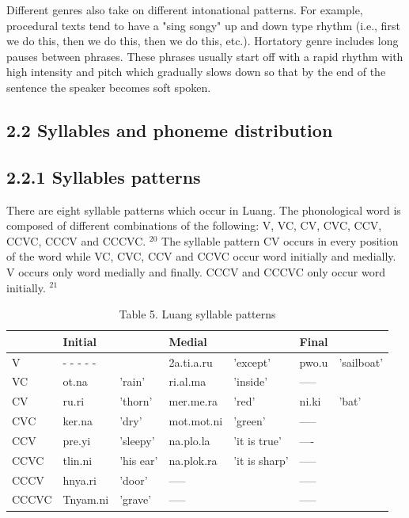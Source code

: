 \documentclass[10pt]{article}
\begin{document}
Different genres also take on different intonational patterns. For example, procedural texts tend to have a "sing songy" up and down type rhythm (i.e., first we do this, then we do this, then we do this, etc.). Hortatory genre includes long pauses between phrases. These phrases usually start off with a rapid rhythm with high intensity and pitch which gradually slows down so that by the end of the sentence the speaker becomes soft spoken.

\subsection*{2.2 Syllables and phoneme distribution}
\subsection*{2.2.1 Syllables patterns}
There are eight syllable patterns which occur in Luang. The phonological word is composed of different combinations of the following: V, VC, CV, CVC, CCV, CCVC, CCCV and CCCVC. \({ }^{20}\) The syllable pattern CV occurs in every position of the word while VC, CVC, CCV and CCVC occur word initially and medially. V occurs only word medially and finally. CCCV and CCCVC only occur word initially. \({ }^{21}\)

\begin{table}[h]
\begin{center}
\captionsetup{labelformat=empty}
\caption{Table 5. Luang syllable patterns}
\begin{tabular}{|l|l|l|l|l|l|l|}
\hline
 & \multicolumn{2}{|l|}{Initial} & \multicolumn{2}{|l|}{Medial} & \multicolumn{2}{|l|}{Final} \\
\hline
V & - - - - - &  & 2a.ti.a.ru & 'except' & pwo.u & 'sailboat' \\
\hline
VC & ot.na & 'rain' & ri.al.ma & 'inside' & ----- &  \\
\hline
CV & ru.ri & 'thorn' & mer.me.ra & 'red' & ni.ki & 'bat' \\
\hline
CVC & ker.na & 'dry' & mot.mot.ni & 'green' & ----- &  \\
\hline
CCV & pre.yi & 'sleepy' & na.plo.la & 'it is true' & ---- &  \\
\hline
CCVC & tlin.ni & 'his ear' & na.plok.ra & 'it is sharp' & ----- &  \\
\hline
CCCV & hnya.ri & 'door' & ----- &  & ----- &  \\
\hline
CCCVC & Tnyam.ni & 'grave' & ----- &  & ----- &  \\
\hline
\end{tabular}
\end{center}
\end{table}
\end{document}
